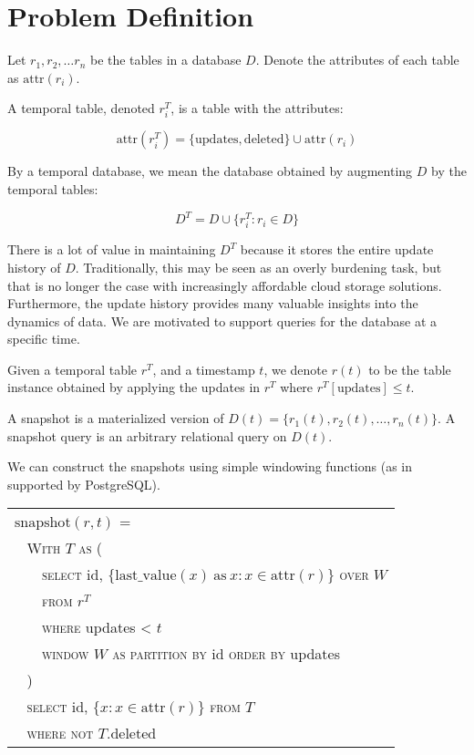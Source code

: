 \newcommand{\attr}{\mathrm{attr}}

\section{Problem Definition}

\begin{definition}
    Let $r_1, r_2, \dots r_n$ be the tables
    in a database $D$.  Denote the attributes
    of each table as $\attr(r_i)$.

    A temporal table, denoted $r_i^T$, is
    a table with the attributes:

    $$\attr(r_i^T) = \{\mathrm{updates}, \mathrm{deleted}\} \cup \attr(r_i)$$

    By a temporal database, we mean the database obtained by augmenting
    $D$ by the temporal tables:

    $$ D^T = D \cup \{r_i^T: r_i\in D\} $$
\end{definition}

There is a lot of value in maintaining $D^T$ because it stores the entire update
history of $D$.  Traditionally, this may be seen as an overly burdening task,
but that is no longer the case with increasingly affordable cloud storage
solutions.  Furthermore, the update history provides many valuable insights into
the dynamics of data. We are motivated to support queries for the database at a
specific time.

\begin{definition}
    Given a temporal table $r^T$, and a timestamp $t$, we denote
    $r(t)$ to be the table instance obtained by applying the updates
    in $r^T$ where $r^T[\mathrm{updates}] \leq t$.

    A snapshot is a materialized version of $D(t) = \{r_1(t), r_2(t), \dots,
    r_n(t)\}$.  A snapshot query is an arbitrary relational query on $D(t)$.
\end{definition}

We can construct the snapshots using simple windowing functions (as in supported
by PostgreSQL).


\vspace{1em}

{\small
\begin{tabular}{|l|} \hline
    $\mathrm{snapshot}(r, t)$ = \\
    \verb| | \textsc{With} $T$ \textsc{as} ( \\
    \verb|   | \textsc{select} id, $\{\mathrm{last\_value}(x) \mathrm{\ as\ } x:
    x\in\attr(r)\}$ \textsc{over} $W$ \\
    \verb|   | \textsc{from} $r^T$ \\
    \verb|   | \textsc{where} updates < $t$ \\
    \verb|   | \textsc{window} $W$ \textsc{as} 
              \textsc{partition by} id \textsc{order by} updates\\
    \verb| | ) \\
    \verb| | \textsc{select} id, $\{x: x\in\attr(r)\}$ \textsc{from} $T$ \\
    \verb| | \textsc{where not} $T.$deleted \\ \hline
\end{tabular}
}

